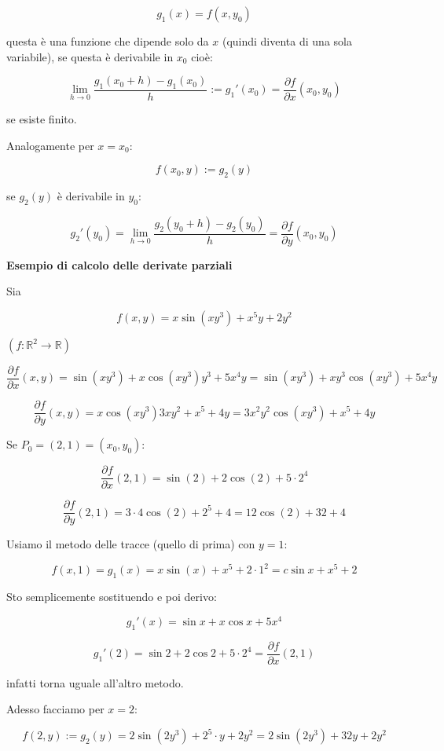 \documentclass[11pt]{article}
\begin{document}
\[
    g_1(x)= f(x,y_0) 
\]

questa è una funzione che dipende solo da $x$ (quindi diventa di una sola variabile), se questa è derivabile in $x_0$ cioè:

\[
    \lim_{ h \to 0 } \frac{g_1(x_0+h)-g_1(x_0)}{h} := g_1'(x_0) = \frac{\partial f}{\partial x}(x_0,y_0)
\]

se esiste finito.

Analogamente per $x=x_0$:

\[
    f(x_0,y) := g_2(y)
\]

se $g_2(y)$ è derivabile in $y_0$:

\[
    g_2'(y_0)  = \lim_{ h \to 0 } \frac{g_2(y_0+h)-g_2(y_0)}{h} = \frac{\partial f}{\partial y}(x_0,y_0)
\]


\textbf{Esempio di calcolo delle derivate parziali} 

Sia 

\[
f(x,y) = x \sin(xy^{3})+x^{5}y+2y^{2} 
\]

$(f: \mathbb{R}^{2}\rightarrow \mathbb{R})$


\[
    \frac{\partial f}{\partial x}(x,y) = \sin(xy^{3}) + x \cos(xy^{3}) y^{3}+5x^{4}y = \sin(xy^{3}) +xy^{3} \cos(xy^{3}) + 5x^{4}y
\]

\[
    \frac{\partial f}{\partial y}(x,y)  = x \cos(xy^{3}) 3xy^{2}+x^{5}+4y = 3 x^{2}y^{2} \cos(xy^{3}) + x^{5}+4y
\]

Se $P_0 = (2,1) = (x_0,y_0)$:

\[
    \frac{\partial f}{\partial x}(2,1) = \sin(2) + 2 \cos(2) + 5\cdot 2^{4} 
\]

\[
    \frac{\partial f}{\partial y}(2,1)  = 3\cdot 4 \cos(2) + 2^{5}+4 = 12 \cos(2) +32 + 4
\]

Usiamo il metodo delle tracce (quello di prima) con $y=1$:

\[
    f(x,1) = g_1(x)  = x \sin(x) + x^{5}+2 \cdot 1^{2} = c \sin x + x^{5}+2
\]

Sto semplicemente sostituendo e poi derivo:

\[
    g_1'(x) = \sin x+ x \cos x + 5x^{4}
\]

\[
    g_1'(2) = \sin 2 + 2 \cos 2 + 5 \cdot 2^{4} = \frac{\partial f}{\partial x}(2,1)
\]

infatti torna uguale all'altro metodo.

Adesso facciamo per $x=2$:

\[
    f(2,y) := g_2(y) = 2 \sin(2y^{3}) + 2^{5} \cdot y + 2y^{2} = 2 \sin(2y^{3}) + 32y + 2y^{2}
\]
\end{document}
